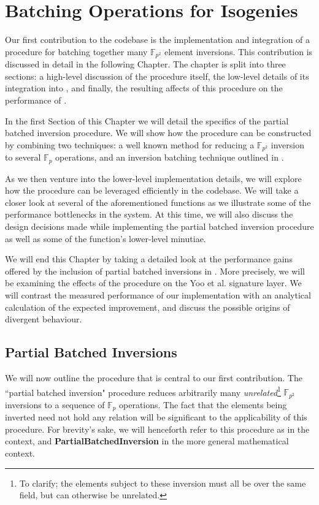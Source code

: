 \chapter{Batching Operations for Isogenies}
\label{sec:batching}

Our first contribution to the \sidh codebase is the implementation and integration of a procedure for batching together many $\mathbb{F}_{p^2}$ element inversions. This contribution is discussed in detail in the following Chapter. The chapter is split into three sections: a high-level discussion of the procedure itself, the low-level details of its integration into \sidh, and finally, the resulting affects of this procedure on the performance of \sidh. 

In the first Section of this Chapter we will detail the specifics of the partial batched inversion procedure. We will show how the procedure can be constructed by combining two techniques: a well known method for reducing a $\mathbb{F}_{p^2}$ inversion to several $\mathbb{F}_{p}$ operations, and an inversion batching technique outlined in \cite{batching}. 

As we then venture into the lower-level implementation details, we will explore how the procedure can be leveraged efficiently in the codebase. We will take a closer look at several of the aforementioned \sidh functions as we illustrate some of the performance bottlenecks in the system. At this time, we will also discuss the design decisions made while implementing the partial batched inversion procedure as well as some of the function's lower-level minutiae.

We will end this Chapter by taking a detailed look at the performance gains offered by the inclusion of partial batched inversions in \sidh. More precisely, we will be examining the effects of the procedure on the Yoo et al. signature layer. We will contrast the measured performance of our implementation with an analytical calculation of the expected improvement, and discuss the possible origins of divergent behaviour.\\ 

\section{Partial Batched Inversions}
\label{sec:pbi}

We will now outline the procedure that is central to our first contribution. The ``partial batched inversion" procedure reduces arbitrarily many \emph{unrelated}\footnote{To clarify; the elements subject to these inversion must all be over the same field, but can otherwise be unrelated.} $\mathbb{F}_{p^{2}}$ inversions to a sequence of $\mathbb{F}_{p}$ operations. The fact that the elements being inverted need not hold any relation will be significant to the applicability of this procedure. For brevity's sake, we will henceforth refer to this procedure as  in the \sidh context, and \textbf{PartialBatchedInversion} in the more general mathematical context.

